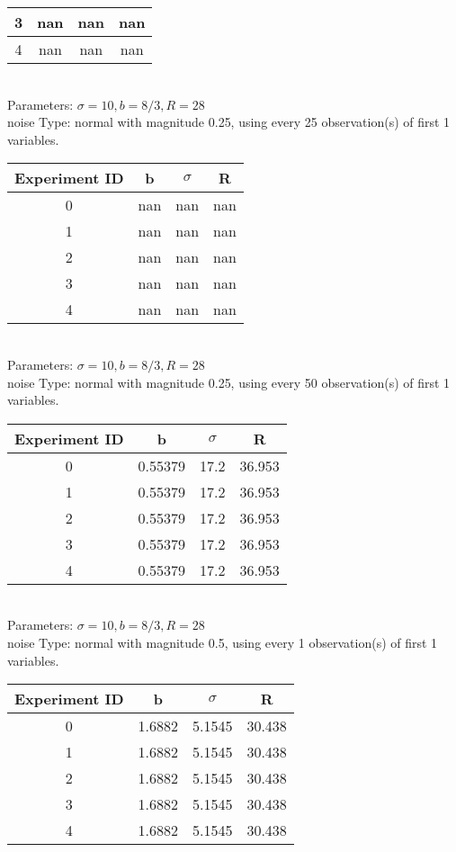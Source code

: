 \begin{multicols}{3}
\begin{tabular}{cccc}
 3 & nan & nan & nan\\ \hline 
 4 & nan & nan & nan\\ \hline 
 \end{tabular}\\
Parameters: $\sigma=10, b=8/3, R=28$\\
noise Type: normal with magnitude 0.25, using every 25 observation(s) of first 1 variables.\\
\begin{tabular}{cccc}
\hline Experiment ID & b & $\sigma$ & R \\ \hline 
0 & nan & nan & nan\\ \hline 
 1 & nan & nan & nan\\ \hline 
 2 & nan & nan & nan\\ \hline 
 3 & nan & nan & nan\\ \hline 
 4 & nan & nan & nan\\ \hline 
 \end{tabular}\\
Parameters: $\sigma=10, b=8/3, R=28$\\
noise Type: normal with magnitude 0.25, using every 50 observation(s) of first 1 variables.\\
\begin{tabular}{cccc}
\hline Experiment ID & b & $\sigma$ & R \\ \hline 
0 & 0.55379 & 17.2 & 36.953\\ \hline 
 1 & 0.55379 & 17.2 & 36.953\\ \hline 
 2 & 0.55379 & 17.2 & 36.953\\ \hline 
 3 & 0.55379 & 17.2 & 36.953\\ \hline 
 4 & 0.55379 & 17.2 & 36.953\\ \hline 
 \end{tabular}\\
Parameters: $\sigma=10, b=8/3, R=28$\\
noise Type: normal with magnitude 0.5, using every 1 observation(s) of first 1 variables.\\
\begin{tabular}{cccc}
\hline Experiment ID & b & $\sigma$ & R \\ \hline 
0 & 1.6882 & 5.1545 & 30.438\\ \hline 
 1 & 1.6882 & 5.1545 & 30.438\\ \hline 
 2 & 1.6882 & 5.1545 & 30.438\\ \hline 
 3 & 1.6882 & 5.1545 & 30.438\\ \hline 
 4 & 1.6882 & 5.1545 & 30.438\\ \hline 

\end{tabular}
\end{multicols}
